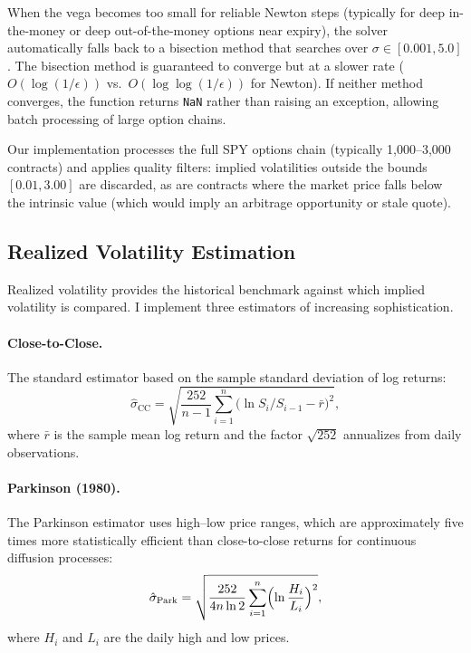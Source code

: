 \documentclass[11pt,a4paper]{article}
\begin{document}
When the vega becomes too small for reliable Newton steps (typically for deep in-the-money or deep out-of-the-money options near expiry), the solver automatically falls back to a bisection method that searches over $\sigma \in [0.001, 5.0]$. The bisection method is guaranteed to converge but at a slower rate ($O(\log(1/\epsilon))$ vs.\ $O(\log\log(1/\epsilon))$ for Newton). If neither method converges, the function returns \texttt{NaN} rather than raising an exception, allowing batch processing of large option chains.

Our implementation processes the full SPY options chain (typically 1,000--3,000 contracts) and applies quality filters: implied volatilities outside the bounds $[0.01, 3.00]$ are discarded, as are contracts where the market price falls below the intrinsic value (which would imply an arbitrage opportunity or stale quote).


\subsection{Realized Volatility Estimation}\label{subsec:realized_vol}

Realized volatility provides the historical benchmark against which implied volatility is compared. I implement three estimators of increasing sophistication.

\paragraph{Close-to-Close.}
The standard estimator based on the sample standard deviation of log returns:
\begin{equation}\label{eq:cc_vol}
    \hat{\sigma}_{\text{CC}} = \sqrt{\frac{252}{n-1} \sum_{i=1}^{n} \bigl(\ln S_i / S_{i-1} - \bar{r}\bigr)^2},
\end{equation}
where $\bar{r}$ is the sample mean log return and the factor $\sqrt{252}$ annualizes from daily observations.

\paragraph{Parkinson (1980).}
The Parkinson estimator \citep{parkinson1980extreme} uses high--low price ranges, which are approximately five times more statistically efficient than close-to-close returns for continuous diffusion processes:
\begin{equation}\label{eq:parkinson}
    \hat{\sigma}_{\text{Park}} = \sqrt{\frac{252}{4 n \ln 2} \sum_{i=1}^{n} \Bigl(\ln \frac{H_i}{L_i}\Bigr)^2},
\end{equation}
where $H_i$ and $L_i$ are the daily high and low prices.
\end{document}
